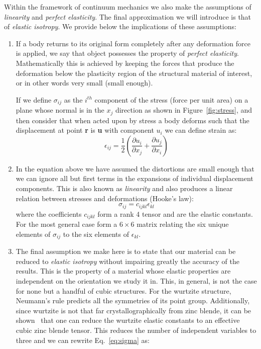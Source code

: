 Within the framework of continuum mechanics we also make the assumptions of \textit{linearity} and \textit{perfect elasticity}. The final approximation we will introduce is that of \textit{elastic isotropy}. We provide below the implications of these assumptions:
\begin{enumerate}
\item If a body returns to its original form completely after any deformation force is applied, we say that object possesses the property of \textit{perfect elasticity}. Mathematically this is achieved by keeping the forces that produce the deformation below the plasticity region of the structural material of interest, or in other words very small (small enough).

If we define $\sigma_{ij}$ as the $i^{th}$ component of the stress (force per unit area) on a plane whose normal is in the $x_{j}$ direction as shown in Figure~\ref{fig:stress}, and then consider that when acted upon by stress a body deforms such that the displacement at point \textbf{r} is \textbf{u} with component $u_{i}$ we can define strain as:
\begin{equation}
\label{eq:epsilon}
\epsilon_{ij}=\dfrac{1}{2}\left(\dfrac{\partial u_i}{\partial x_j} + \dfrac{\partial u_j}{\partial x_i}\right)
\end{equation}

\item In the equation above we have assumed the distortions are small enough that we can ignore all but first terms in the expansions of individual displacement components. This is also known as \textit{linearity} and also produces a linear relation between stresses and deformations (Hooke's law):
\begin{equation}
\label{eq:sigma}
\sigma_{ij}=c_{ijkl}\epsilon_{kl}
\end{equation}
where the coefficients $c_{ijkl}$ form a rank 4 tensor and are the elastic constants. For the most general case form a $6\times6$ matrix relating the six unique elements of $\sigma_{ij}$ to the six elements of $\epsilon_{kl}$. 

\item The final assumption we make here is to state that our material can be reduced to \textit{elastic isotropy} without impairing greatly the accuracy of the results. This is the property of a material whose elastic properties are independent on the orientation we study it in. This, in general, is not the case for none but a handful of cubic structures. For the wurtzite structure, Neumann's rule predicts all the symmetries of its point group. Additionally, since wurtzite is not that far crystallographically from zinc blende, it can be shown~\cite{Martin72} that one can reduce the wurtzite elastic constants to an effective cubic zinc blende tensor. This reduces the number of independent variables to three and we can rewrite Eq.~\ref{eq:sigma} as:


\end{enumerate}
